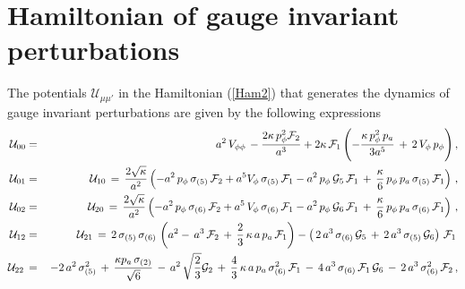 \documentclass[11pt,tightenlines,eqsecnum,floats,aps,amsmath,amssymb,nofootinbib,prd,floatfix]{revtex4}
\def\f{\frac}
\def\pp{p_{\phi}}
\newcommand{\bea}{\nopagebreak[3]\begin{eqnarray}}
\newcommand{\ea}{\end{eqnarray}}
\newcommand{\<}{\langle}
\renewcommand{\>}{\rangle}
\begin{document}
\section{Hamiltonian of gauge invariant perturbations}\label{app}
The potentials $\mathcal{U}_{\mu\mu'}$ in the Hamiltonian (\ref{Ham2}) that generates the dynamics of gauge invariant perturbations are given by the following expressions
%
{\bea
\, {\cal U}_{00}&=&a^2\, V_{\phi\phi}\, - \frac{2 \kappa \, \pp^2 {\cal F}_2}{a^3}  + 2 \kappa  \, {\cal F}_1  \left(-\frac{\kappa\,\pp^2\,p_a}{3a^{5}}\, + \,2 \,V_{\phi}\, \pp\right),\\ \nonumber
{\cal U}_{01}&=&{\cal U}_{10} \,= \,\frac{2\sqrt{\kappa}}{a^2}\left(-a^2\,\pp\, \sigma_{(5)} \, {\cal F}_2  + a^5V_{\phi} \, \sigma_{(5)}\, {\cal F}_1 - a^2\,\pp \, {\cal G}_{5}\,  {\cal F}_1\, +\, \frac{\kappa}{6}\,\pp\,p_a\,\sigma_{(5)}\,{\cal F}_1\right)\,,\\ \nonumber
{\cal U}_{02}&=&{\cal U}_{20}\,= \,\frac{2\sqrt{\kappa}}{a^2}\left(-a^2\,\pp\, \sigma_{(6)} \, {\cal F}_2  + a^5\,V_{\phi} \, \sigma_{(6)}\, {\cal F}_1 - a^2\,\pp \, {\cal G}_{6}\,  {\cal F}_1\, +\, \frac{\kappa}{6}\,\pp\,p_a\,\sigma_{(6)}\,{\cal F}_1\right)\,,\\ \nonumber
{\cal U}_{12}&=&{\cal U}_{21}\,=\, 2\,\sigma_{(5)}\,\sigma_{(6)}\,\left( a^2 -\, a^3\,{\cal F}_2\,+\, \frac{2}{3}\,\kappa\,a\,p_a\,{\cal F}_1\right) - \left( \, 2\,a^3\,\sigma_{(6)}\,{\cal G}_{5}\, +\, 2\,a^3\,\sigma_{(5)}\,{\cal G}_{6}\right)\,{\cal F}_1\, \\ \nonumber
{\cal U}_{22}\, &=&\,- 2 \,a^2\, \sigma_{(5)}^2\, +\,\frac{\kappa p_a \,\sigma_{(2)}}{\sqrt{6}}\,-\,a^2\,\sqrt{\f{2}{3}}{\cal G}_2\, +\,\frac{4}{3}\,\kappa\,a\,p_a\,\sigma_{(6)}^2\,{\cal F}_1\,-\,4 \,a^3 \,\sigma_{(6)}\, {\cal F}_1\, {\cal G}_6\,-\,2\,a^3\, \sigma_{(6)}^2\, {\cal F}_2\,, \ea}
%  
\end{document}
